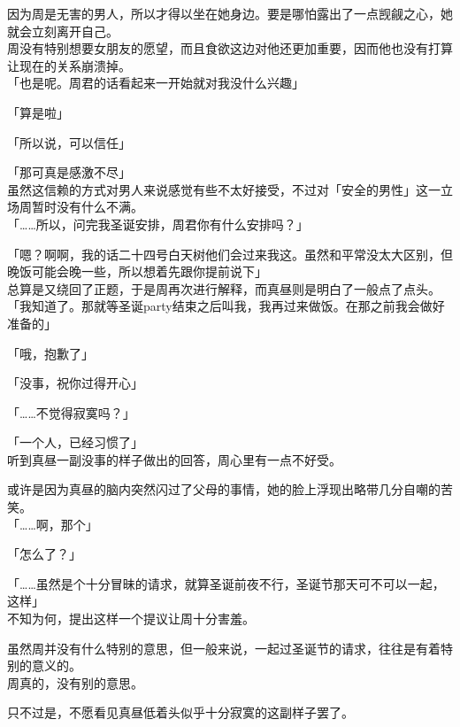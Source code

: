 因为周是无害的男人，所以才得以坐在她身边。要是哪怕露出了一点觊觎之心，她就会立刻离开自己。\\

周没有特别想要女朋友的愿望，而且食欲这边对他还更加重要，因而他也没有打算让现在的关系崩溃掉。\\

「也是呢。周君的话看起来一开始就对我没什么兴趣」

「算是啦」

「所以说，可以信任」

「那可真是感激不尽」\\

虽然这信赖的方式对男人来说感觉有些不太好接受，不过对「安全的男性」这一立场周暂时没有什么不满。\\

「……所以，问完我圣诞安排，周君你有什么安排吗？」

「嗯？啊啊，我的话二十四号白天树他们会过来我这。虽然和平常没太大区别，但晚饭可能会晚一些，所以想着先跟你提前说下」\\

总算是又绕回了正题，于是周再次进行解释，而真昼则是明白了一般点了点头。\\

「我知道了。那就等圣诞party结束之后叫我，我再过来做饭。在那之前我会做好准备的」

「哦，抱歉了」

「没事，祝你过得开心」

「……不觉得寂寞吗？」

「一个人，已经习惯了」\\

听到真昼一副没事的样子做出的回答，周心里有一点不好受。

或许是因为真昼的脑内突然闪过了父母的事情，她的脸上浮现出略带几分自嘲的苦笑。\\

「……啊，那个」

「怎么了？」

「……虽然是个十分冒昧的请求，就算圣诞前夜不行，圣诞节那天可不可以一起，这样」\\

不知为何，提出这样一个提议让周十分害羞。

虽然周并没有什么特别的意思，但一般来说，一起过圣诞节的请求，往往是有着特别的意义的。\\

周真的，没有别的意思。

只不过是，不愿看见真昼低着头似乎十分寂寞的这副样子罢了。\\

